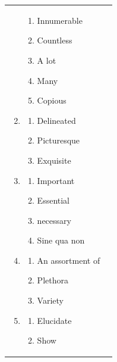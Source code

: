 \documentclass[oneside]{book}
\begin{document}
\begin{tabularx}{\textwidth}{XX}
\begin{enumerate}
\begin{enumerate}
            \item Innumerable 
            \item Countless
            \item A lot
            \item Many
            \item Copious
        \end{enumerate}
        \item \begin{enumerate}
            \item Delineated
            \item Picturesque
            \item Exquisite
        \end{enumerate}
        \item \begin{enumerate}
            \item  Important
            \item Essential 
            \item necessary
            \item Sine qua non 
        \end{enumerate}
        \item \begin{enumerate}
            \item An assortment of 
            \item Plethora
            \item Variety
        \end{enumerate}
        \item \begin{enumerate}
            \item Elucidate
            \item Show
        \end{enumerate}
    \end{enumerate}
  \end{tabularx}
\end{document}
